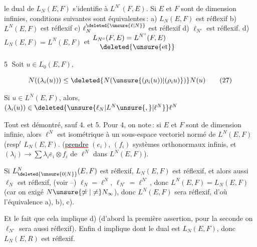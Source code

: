 le dual de $L_N(E,F)$ s'identifie à $L^{N^\circ}(F,E)$. Si $E$ et $F$ sont de dimension infinies,   conditions suivantes sont équivalentes\,: a) $L_N(E,F)$ est réflexif  b) $L^N(E,F)$ est réflexif c) $\ell^{\deleted{\unsure{\ell|N}}}_{N}$ est réflexif  d) $\ell_{N'}$ est réflexif.   d) $L_N(E,F)=L^N(E,F)$ et $\begin{aligned}&L_{N^\circ}(F,E)=L^{N^\circ}(F,E)\\[-0.5ex]&\quad\text{\deleted{\unsure{et}}}\end{aligned}$

\textcircled{5}  Soit $u\in L_0(E,F)$,  

\[
N((\lambda_i(u)))\leq\deleted{N(\unsure{(\rho_i(u))|(\rho_i u)})}N(u)\tag*{(27)}
\]

Si $u\in L^N(E,F)$,  alors, $(\lambda_i(u))\in\deleted{\unsure{\ell_N|L^N\unsure{,}|\ell^N}}\ell^N$ 

Tout est démontré, sauf 4.  et 5. Pour 4, on note\,: si $E$ et $F$ sont de dimension infinie, alors $\ell^N$  est isométrique à un sous-espace vectoriel normé de $L^N(E,F)$ (resp$^t$ $L_N(E,F)$. (\textcolor{red}{\uline{\textcolor{black}{prendre}}} $(e_i)$, $(f_i)$ systèmes orthonormaux infinis, et $(\lambda_i)\to\sum\lambda_i\bar e_i\otimes f_i$ de $\ell^N$ dans $L^N(E,F)$). 

Si $L^N_{\deleted{\unsure{0|N}}}(E,F)$ est réflexif, $L_N(E,F)$ est réflexif, et alors aussi $\ell_N$ est réflexif,  (voir --) $\ell_N=\ell^N$, $\ell_{N^\circ}=\ell^{N^\circ}$, donc $L^N(E,F)=L_N(E,F)$ (car on  exigé $N\unsure{\not\simeq|\neq}N_\infty$), donc $L^N(E,F)$ sera réflexif, d'où l'équivalence a), b), c).

Et le fait que cela implique d) (d'abord la première assertion, pour la seconde on $\ell_{N^\circ}$ sera aussi réflexif). Enfin d implique   dont le dual est $L_N(E,F)$, donc $L_N(E,R)$ est réflexif.

